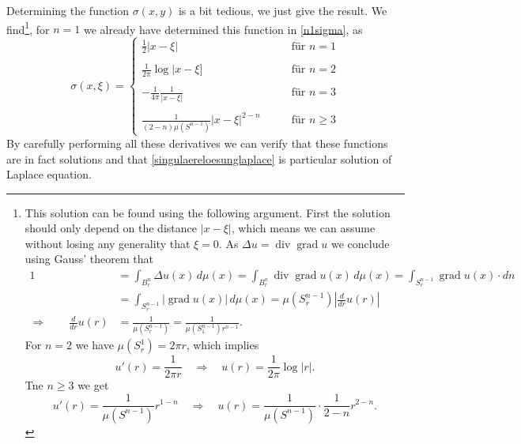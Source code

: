 Determining the function $\sigma(x,y)$ is a bit tedious, we just give the
result.
We find\footnote{%
This solution can be found using the following argument.
First the solution should only depend on the distance $|x-\xi|$, which
means we can assume without losing any generality that $\xi=0$.
As $\Delta u=\operatorname{div}\operatorname{grad}u$ we  conclude using
Gauss' theorem that
\begin{align*}
1&=\int_{B_r^n} \Delta u(x)\,d\mu(x)
=
\int_{B_r^n} \operatorname{div}\operatorname{grad} u(x)\,d\mu(x)
=\int_{S_r^{n-1}}\operatorname{grad}u(x)\cdot dn
\\
&=\int_{S_r^{n-1}}|\operatorname{grad}u(x)|\,d\mu(x)
=\mu(S_r^{n-1})\left|\frac{d}{dr}u(r)\right|
\\
\Rightarrow\qquad\frac{d}{dr}u(r)
&=\frac1{\mu(S_r^{n-1})}
=\frac1{\mu(S_1^{n-1})r^{n-1}}.
\end{align*}
For $n=2$ we have
$\mu(S_r^1)=2\pi r$, which implies
\[
u'(r)=\frac1{2\pi r}\quad\Rightarrow\quad u(r)=\frac1{2\pi}\log|r|.
\]
Tne $n\ge 3$ we get
\[
u'(r)=\frac1{\mu(S^{n-1})}r^{1-n}\quad\Rightarrow\quad u(r)=\frac1{\mu(S^{n-1})}\cdot \frac1{2-n}r^{2-n}.
\]
},
for $n=1$ we already have determined this function in \eqref{n1sigma}, as
\begin{equation}
\sigma(x,\xi)=
\begin{cases}
\displaystyle \frac12|x-\xi|
&\qquad \text{für $n=1$}
\\
\\
\displaystyle \frac1{2\pi}\log|x-\xi]
&\qquad \text{für $n=2$}
\\
\\
\displaystyle -\frac1{4\pi}\frac1{|x-\xi|}
&\qquad \text{für $n= 3$}
\\
\\
\displaystyle \frac1{(2-n)\mu(S^{n-1})}|x-\xi|^{2-n}
&\qquad \text{für $n\ge 3$}
\end{cases}
\end{equation}
By carefully performing all these derivatives we can verify
that these functions are in fact solutions and that
\eqref{singulaereloesunglaplace} is particular solution of
Laplace equation.


